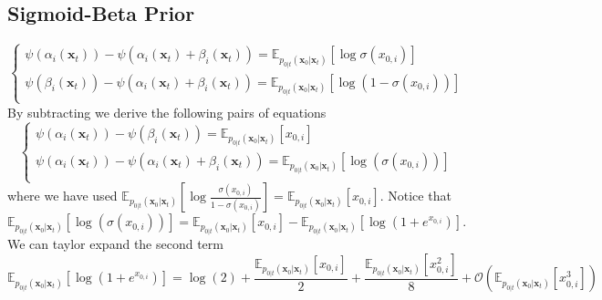 \subsection{Sigmoid-Beta Prior}
\begin{equation}
\begin{cases}
\psi(\alpha_{i}(\mathbf{x}_{t})) -\psi(\alpha_{i}(\mathbf{x}_{t})+\beta_{i}(\mathbf{x}_{t}))  = \mathbb{E}_{p_{0\vert t}(\mathbf{x}_{0}\vert \mathbf{x}_{t})}[\log \sigma(x_{0,i})] \\ 
\psi(\beta_{i}(\mathbf{x}_{t})) -\psi(\alpha_{i}(\mathbf{x}_{t})+\beta_{i}(\mathbf{x}_{t}))  = \mathbb{E}_{p_{0\vert t}(\mathbf{x}_{0}\vert \mathbf{x}_{t})}[\log (1-\sigma(x_{0,i}))]\\  
\end{cases}
\end{equation}
By subtracting we derive the following pairs of equations 
\begin{equation}
    \begin{cases}
        \psi(\alpha_{i}(\mathbf{x}_{t})) -\psi(\beta_{i}(\mathbf{x}_{t})) =\mathbb{E}_{p_{0\vert t}(\mathbf{x}_{0}\vert \mathbf{x}_{t})}[x_{0,i}] \\ 
\psi(\alpha_{i}(\mathbf{x}_{t})) -\psi(\alpha_{i}(\mathbf{x}_{t})+\beta_{i}(\mathbf{x}_{t}))  = \mathbb{E}_{p_{0\vert t}(\mathbf{x}_{0}\vert \mathbf{x}_{t})}[\log (\sigma(x_{0,i}))]\\ 
    \end{cases}
\end{equation}
where we have used
$\mathbb{E}_{p_{0\vert t}(\mathbf{x}_{0}\vert \mathbf{x}_{t})}[\log \frac{\sigma(x_{0,i})}{1-\sigma(x_{0,i})}] =\mathbb{E}_{p_{0\vert t}(\mathbf{x}_{0}\vert \mathbf{x}_{t})}[x_{0,i}]$. 
Notice that $\mathbb{E}_{p_{0\vert t}(\mathbf{x}_{0}\vert \mathbf{x}_{t})}[\log (\sigma(x_{0,i}))]= \mathbb{E}_{p_{0\vert t}(\mathbf{x}_{0}\vert \mathbf{x}_{t})}[x_{0,i}] -\mathbb{E}_{p_{0\vert t}(\mathbf{x}_{0}\vert \mathbf{x}_{t})}[\log (1 + e^{x_{0,i}})]$. We can taylor expand the second term 
\begin{equation}
    \mathbb{E}_{p_{0\vert t}(\mathbf{x}_{0}\vert \mathbf{x}_{t})}[\log (1 + e^{x_{0,i}})] = \log(2) + \frac{\mathbb{E}_{p_{0\vert t}(\mathbf{x}_{0}\vert \mathbf{x}_{t})}[x_{0,i}] }{2} + \frac{\mathbb{E}_{p_{0\vert t}(\mathbf{x}_{0}\vert \mathbf{x}_{t})}[x_{0,i}^{2}]}{8} + \mathcal{O}
\left(\mathbb{E}_{p_{0\vert t}(\mathbf{x}_{0}\vert \mathbf{x}_{t})}[x_{0,i}^{3}]\right)
\end{equation}
